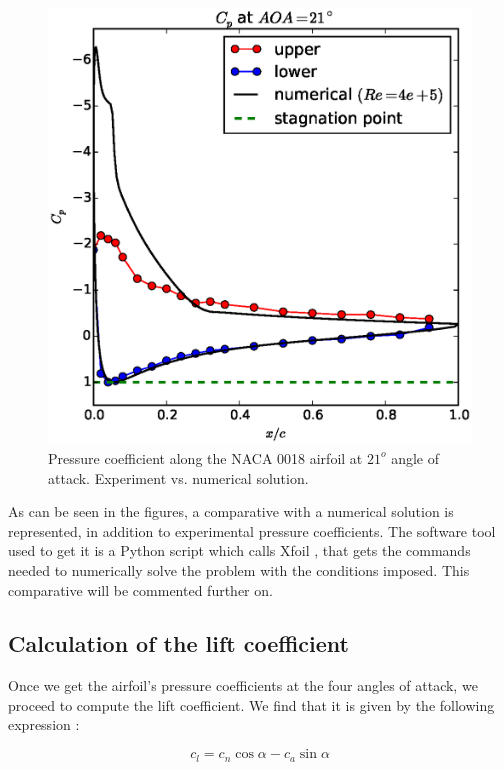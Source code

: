 \documentclass[10pt]{SelfArx} %
\begin{document}
\begin{figure}[ht!]
\centering
\includegraphics[scale=0.55]{plots/compared-cp-at-aoa21.eps}
\caption{Pressure coefficient along the NACA 0018 airfoil at $21^{o}$ angle of attack. Experiment vs. numerical solution.}
\end{figure}

As can be seen in the figures, a comparative with a numerical solution is represented, in addition to experimental pressure coefficients. The software tool used to get it is a Python script \cite{Pablo:source-code} which calls Xfoil \cite{Drela:user-primer}, that gets the commands needed to numerically solve the problem with the conditions imposed. This comparative will be commented further on.

\subsection{Calculation of the lift coefficient}

Once we get the airfoil's pressure coefficients at the four angles of attack, we proceed to compute the lift coefficient. We find that it is given by the following expression \cite{Anderson:book-fundamentals}:

\begin{equation} c_{l} = c_{n} \cos{\alpha} - c_{a} \sin{\alpha} \end{equation}
\end{document}
